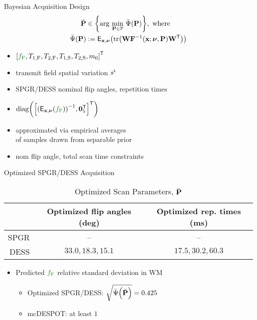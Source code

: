 \begin{frame}{Bayesian Acquisition Design}
	\begin{align}
    \breve{\bmP} &\in 
    	\set{%
        \argmin{\bmP \in \setP}
        \expcost\paren{\bmP}
    	}, \where \nonumber \\
		\expcost\paren{\bmP} &:=
    	\expect{\bmx,\bmnu}{\trace{\bmW \bmF^{-1}\paren{\bmx; \bmnu, \bmP} \bmW\tpose}}
  \end{align}
  \vspace{-0.5cm}
  \begin{itemize}
  	\item<2>{%
			\makebox[1.5cm][l]{$\bmx$} 
			$\brac{\hlg{\ff}, \tf{1}, \tf{2}, \ts{1}, \ts{2}, \mzero}\tpose$
		}%
		\item<2>{%
			\makebox[1.5cm][l]{$\bmnu$}
			transmit field spatial variation $s^{\mathrm{t}}$
		}%
		\item<2>{%
			\makebox[1.5cm][l]{$\bmP$}
			SPGR/DESS nominal flip angles, repetition times
		}%
		\item<3>{%
			\makebox[1.5cm][l]{$\bmW$}
			$\diag{\brac{\inv{\expect{\bmx,\bmnu}{\hlg{\ff}}}, \zeros{5}\tpose}\tpose}$
		}%
		\item<4>{%
			\makebox[1.5cm][l]{$\expect{\bmx,\bmnu}{\cdot}$}
			approximated via empirical averages \\
			\makebox[1.5cm][l]{}
			of samples drawn from separable prior
		}%
		\item<5>{%
			\makebox[1.5cm][l]{$\setP$}
			nom flip angle, total scan time constraints
		}%
  \end{itemize}
\end{frame}

\begin{frame}{Optimized SPGR/DESS Acquisition}
	\begin{table}[!tb]
    \centering
    \begin{tabular}{r | c | c}
      \hline
      \hline
      & Optimized flip angles (deg) & Optimized rep. times (ms) \\
      \hline
    	SPGR & -- 										& -- \\
    	DESS & $33.0,18.3,15.1$ 			& $17.5,30.2,60.3$ \\
      \hline
      \hline
    \end{tabular}
    \caption{Optimized Scan Parameters, $\breve{\mathbf{P}}$}
		\label{tab:mwf,acq}
	\end{table}
	\vspace{-0.5cm}
	\begin{itemize}
		\item{%
			Predicted $\hlg{\ff}$ relative standard deviation in WM
			\begin{itemize} 
				\item{%
					Optimized SPGR/DESS:
					$\sqrt{\expcost\paren{\breve{\bmP}}} = 0.425$
				}%
				\item{%
					mcDESPOT: 
					at least $1$ \hfill {}
				}%
			\end{itemize}
		}%
	\end{itemize}
\end{frame}


